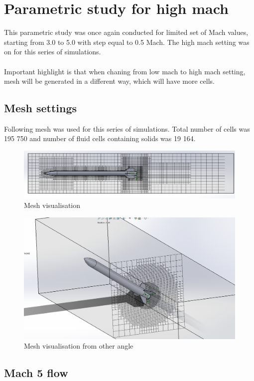 \documentclass{article}
\begin{document}
\newpage
\section{Parametric study for high mach}
This parametric study was once again conducted for limited set of Mach values, 
starting from 3.0 to 5.0 with step equal to 0.5 Mach. The high mach setting was on for this 
series of simulations. \\\\
Important highlight is that when chaning from low mach to high mach setting, mesh will be generated 
in a different way, which will have more cells.

\subsection{Mesh settings}
Following mesh was used for this series of simulations. Total number of cells was 195 750 and number of
fluid cells containing solids was 19 164. 
\begin{figure}[H]
    \centering
    \includegraphics[width=\textwidth]{Final50Mesh}
    \caption{Mesh visualisation}
    \label{fig:Final50MESH}
\end{figure}
\begin{figure}[H]
    \centering
    \includegraphics[width=\textwidth]{Final50Mesh1}
    \caption{Mesh visualisation from other angle}
    \label{fig:Final50MESH1}
    \end{figure}
\subsection{Mach 5 flow}
\end{document}

